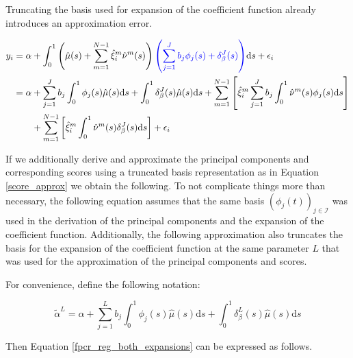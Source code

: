 \documentclass[11pt,twoside,a4paper]{article}
\begin{document}
	Truncating the basis used for expansion of the coefficient function already introduces an approximation error.
	
	\begin{equation}\label{fpcr_reg_both_expansions}
		\begin{split}
			y_i &= \alpha + \int_{0}^{1} \left(\hat{\mu}(s) + \sum_{m = 1}^{N-1} \hat{\xi}^{m}_i \hat{\nu}^{m}(s)\right) {\color{blue}\left(\sum_{j = 1}^{J} b_j \phi_j(s) + \delta_{\beta}^{J}(s)\right)} \mathrm{d}s + \epsilon_i\\
			&= \alpha + \sum_{j = 1}^{J} b_j \int_{0}^{1} \phi_j(s) \hat{\mu}(s) \mathrm{d}s + \int_{0}^{1} \delta_{\beta}^{J}(s) \hat{\mu}(s) \mathrm{d}s + \sum_{m = 1}^{N-1} \left[ \hat{\xi}^m_i \sum_{j = 1}^{J} b_j \int_{0}^{1}\hat{\nu}^m(s) \phi_j(s) \mathrm{d}s \right] \\
			& \quad \quad + \sum_{m = 1}^{N-1} \left[ \hat{\xi}^m_i \int_{0}^{1}\hat{\nu}^m(s) \delta_{\beta}^{J}(s) \mathrm{d}s \right] + \epsilon_i
		\end{split}
	\end{equation}

	If we additionally derive and approximate the principal components and corresponding scores using a truncated basis representation as in Equation \ref{score_approx} we obtain the following. To not complicate things more than necessary, the following equation assumes that the same basis $\left(\phi_j(t)\right)_{j \in \mathcal{I}}$ was used in the derivation of the principal components and the expansion of the coefficient function. Additionally, the following approximation also truncates the basis for the expansion of the coefficient function at the same parameter $L$ that was used for the approximation of the principal components and scores.
	
	For convenience, define the following notation:
	
	\begin{equation}
		\tilde{\alpha}^L = \alpha + \sum_{j = 1}^{L} b_j \int_{0}^{1} \phi_j(s) \hat{\mu}(s) \mathrm{d}s + \int_{0}^{1} \delta_{\beta}^{L}(s) \hat{\mu}(s) \mathrm{d}s
	\end{equation}
	
	Then Equation \ref{fpcr_reg_both_expansions} can be expressed as follows.
	
\end{document}
